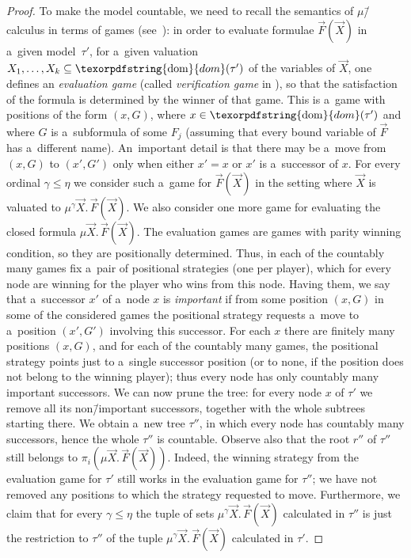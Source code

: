 \documentclass[11pt,a4paper]{amsart}
\theoremstyle{plain}
\theoremstyle{definition}
\theoremstyle{defC}
\theoremstyle{thmC}
\theoremstyle{plain}
\numberwithin{equation}{section}
\numberwithin{equation}{section}
\numberwithin{figure}{section}
\newcommand{\ident}[1]{\ensuremath{\texorpdfstring{\mathrm{\mathnm{#1}}}{#1}}\xspace}
\newcommand{\dom}{\ident{dom}}
\newcommand{\mathnm}[1]{#1}
\begin{document}
\begin{proof}
	To make the model countable, we need to recall the semantics
	of $\mu$\=/calculus in terms of games (see~\cite[Section 26.2.3]{julian-igor-handook}):
	in order to evaluate formulae $\vec{F}(\vec{X})$ in a~given model~$\tau'$, for a~given valuation $X_1,\dots,X_k\subseteq\dom(\tau')$ of the variables of $\vec{X}$,
	one defines an \emph{evaluation game} (called \emph{verification game} in \cite{julian-igor-handook}), so that
	the satisfaction of the formula is determined by the winner of that game.
	This is a~game with positions of the form $(x,G)$, where $x\in\dom(\tau')$ and where $G$ is a~subformula of some $F_j$
	(assuming that every bound variable of $\vec{F}$ has a~different name).
	An~important detail is that there may be a~move from $(x,G)$ to $(x',G')$ only when either $x'=x$ or $x'$ is a~successor of $x$.
	For every ordinal $\gamma\leq\eta$ we consider such a~game for $\vec{F}(\vec{X})$ in the setting where $\vec{X}$ is valuated to $\mu^\gamma\vec{X}.\,\vec{F}(\vec{X})$.
	We also consider one more game for evaluating the closed formula $\mu\vec{X}.\,\vec{F}(\vec{X})$.
	The evaluation games are games with parity winning condition, so they are positionally determined.
	Thus, in each of the countably many games fix a~pair of positional strategies (one per player), which for every node are winning for the player who wins from this node.
	Having them, we say that a~successor $x'$ of a~node $x$ is \emph{important}
	if from some position $(x,G)$ in some of the considered games the positional strategy requests a~move to a~position $(x',G')$ involving this successor.
	For each $x$ there are finitely many positions $(x,G)$, and for each of the countably many games, the positional strategy points just to a~single successor position
	(or to none, if the position does not belong to the winning player); thus every node has only countably many important successors.
	We can now prune the tree: for every node $x$ of $\tau'$ we remove all its non\=/important successors, together with the whole subtrees starting there.
	We obtain a~new tree $\tau''$, in which every node has countably many successors, hence the whole $\tau''$ is countable.
	Observe also that the root $r''$ of $\tau''$ still belongs to $\pi_i(\mu\vec{X}.\,\vec{F}(\vec{X}))$.
	Indeed, the winning strategy from the evaluation game for $\tau'$ still works in the evaluation game for $\tau''$; we have not removed any positions to which the strategy requested to move.
	Furthermore, we claim that for every $\gamma\leq\eta$ the tuple of sets $\mu^\gamma\vec{X}.\,\vec{F}(\vec{X})$ calculated in $\tau''$
	is just the restriction to $\tau''$ of the tuple $\mu^\gamma\vec{X}.\,\vec{F}(\vec{X})$ calculated in $\tau'$.

\end{proof}
\end{document}
